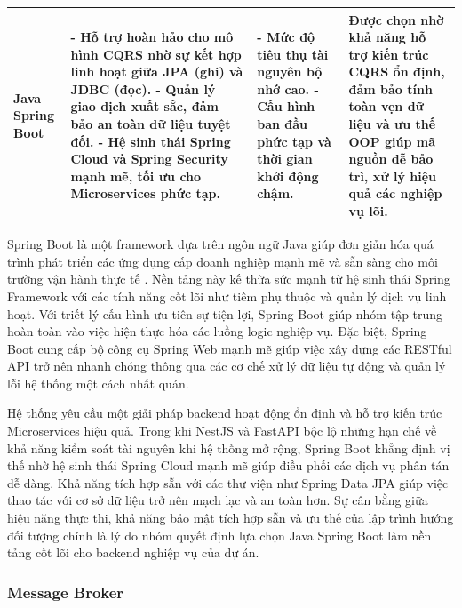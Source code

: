 \begin{center}
\begin{longtable}{|p{2.5cm}|p{4cm}|p{4cm}|p{3.5cm}|}
Java Spring Boot &
- Hỗ trợ hoàn hảo cho mô hình CQRS nhờ sự kết hợp linh hoạt giữa JPA (ghi) và JDBC (đọc). \newline 
- Quản lý giao dịch xuất sắc, đảm bảo an toàn dữ liệu tuyệt đối. \newline 
- Hệ sinh thái Spring Cloud và Spring Security mạnh mẽ, tối ưu cho Microservices phức tạp. & 
- Mức độ tiêu thụ tài nguyên bộ nhớ cao. \newline 
- Cấu hình ban đầu phức tạp và thời gian khởi động chậm. & 
Được chọn nhờ khả năng hỗ trợ kiến trúc CQRS ổn định, đảm bảo tính toàn vẹn dữ liệu và ưu thế OOP giúp mã nguồn dễ bảo trì, xử lý hiệu quả các nghiệp vụ lõi. \\ \hline

\end{longtable}
\end{center} 

\vspace{-40pt}

Spring Boot là một framework dựa trên ngôn ngữ Java giúp đơn giản hóa quá trình phát triển các ứng dụng cấp doanh nghiệp mạnh mẽ và sẵn sàng cho môi trường vận hành thực tế \cite{spring_boot}. Nền tảng này kế thừa sức mạnh từ hệ sinh thái Spring Framework với các tính năng cốt lõi như tiêm phụ thuộc và quản lý dịch vụ linh hoạt. Với triết lý cấu hình ưu tiên sự tiện lợi, Spring Boot giúp nhóm tập trung hoàn toàn vào việc hiện thực hóa các luồng logic nghiệp vụ. Đặc biệt, Spring Boot cung cấp bộ công cụ Spring Web mạnh mẽ giúp việc xây dựng các RESTful API trở nên nhanh chóng thông qua các cơ chế xử lý dữ liệu tự động và quản lý lỗi hệ thống một cách nhất quán.

Hệ thống yêu cầu một giải pháp backend hoạt động ổn định và hỗ trợ kiến trúc Microservices hiệu quả. Trong khi NestJS và FastAPI bộc lộ những hạn chế về khả năng kiểm soát tài nguyên khi hệ thống mở rộng, Spring Boot khẳng định vị thế nhờ hệ sinh thái Spring Cloud mạnh mẽ giúp điều phối các dịch vụ phân tán dễ dàng. Khả năng tích hợp sẵn với các thư viện như Spring Data JPA giúp việc thao tác với cơ sở dữ liệu trở nên mạch lạc và an toàn hơn. Sự cân bằng giữa hiệu năng thực thi, khả năng bảo mật tích hợp sẵn và ưu thế của lập trình hướng đối tượng chính là lý do nhóm quyết định lựa chọn Java Spring Boot làm nền tảng cốt lõi cho backend nghiệp vụ của dự án.

\subsubsection{Message Broker}

